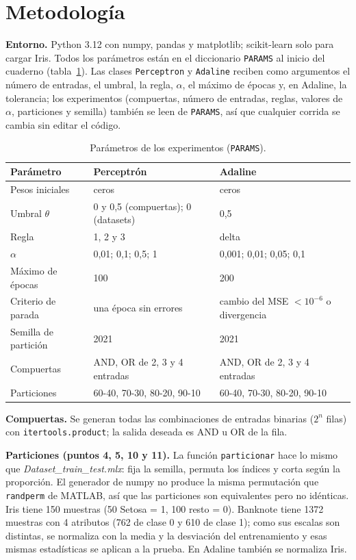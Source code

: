 \documentclass[11pt,letterpaper]{article}
\begin{document}
\section{Metodología}

\textbf{Entorno.} Python 3.12 con numpy, pandas y matplotlib; scikit-learn solo para cargar Iris. Todos los parámetros están en el diccionario \texttt{PARAMS} al inicio del cuaderno (tabla~\ref{tab:params}). Las clases \texttt{Perceptron} y \texttt{Adaline} reciben como argumentos el número de entradas, el umbral, la regla, $\alpha$, el máximo de épocas y, en Adaline, la tolerancia; los experimentos (compuertas, número de entradas, reglas, valores de $\alpha$, particiones y semilla) también se leen de \texttt{PARAMS}, así que cualquier corrida se cambia sin editar el código.

\begin{table}[H]
\centering
\caption{Parámetros de los experimentos (\texttt{PARAMS}).}\label{tab:params}
\begin{tabular}{lll}
\toprule
Parámetro & Perceptrón & Adaline \\
\midrule
Pesos iniciales & ceros & ceros \\
Umbral $\theta$ & 0 y 0,5 (compuertas); 0 (datasets) & 0,5 \\
Regla & 1, 2 y 3 & delta \\
$\alpha$ & 0,01; 0,1; 0,5; 1 & 0,001; 0,01; 0,05; 0,1 \\
Máximo de épocas & 100 & 200 \\
Criterio de parada & una época sin errores & cambio del MSE $< 10^{-6}$ o divergencia \\
Semilla de partición & 2021 & 2021 \\
Compuertas & AND, OR de 2, 3 y 4 entradas & AND, OR de 2, 3 y 4 entradas \\
Particiones & 60-40, 70-30, 80-20, 90-10 & 60-40, 70-30, 80-20, 90-10 \\
\bottomrule
\end{tabular}
\end{table}

\textbf{Compuertas.} Se generan todas las combinaciones de entradas binarias ($2^n$ filas) con \texttt{itertools.product}; la salida deseada es AND u OR de la fila.

\textbf{Particiones (puntos 4, 5, 10 y 11).} La función \texttt{particionar} hace lo mismo que \textit{Dataset\_train\_test.mlx}: fija la semilla, permuta los índices y corta según la proporción. El generador de numpy no produce la misma permutación que \texttt{randperm} de MATLAB, así que las particiones son equivalentes pero no idénticas. Iris tiene 150 muestras (50 Setosa = 1, 100 resto = 0). Banknote tiene 1372 muestras con 4 atributos (762 de clase 0 y 610 de clase 1); como sus escalas son distintas, se normaliza con la media y la desviación del entrenamiento y esas mismas estadísticas se aplican a la prueba. En Adaline también se normaliza Iris.
\end{document}
